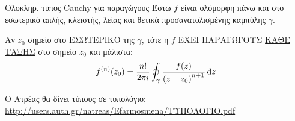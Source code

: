 \documentclass[12pt,a4paper,titlepage,fleqn]{article}
\begin{document}
    \begin{theorem*}{Ολοκληρ. τύπος Cauchy για παραγώγους}
    	\vspace{20pt}
    	Έστω \( f \) είναι ολόμορφη πάνω και στο εσωτερικό απλής, κλειστής, λείας
    	και θετικά προσανατολισμένης καμπύλης \( \gamma \).
    	
    	Αν \( z_0 \) σημείο στο ΕΣΩΤΕΡΙΚΟ της \( \gamma \), τότε η \( f \)
    	ΕΧΕΙ ΠΑΡΑΓΩΓΟΥΣ \underline{ΚΑΘΕ ΤΑΞΗΣ} στο σημείο \( z_0 \) και μάλιστα:
    	\[
    	f^{(n)}(z_0) = \frac{n!}{2\pi i}\oint_\gamma
    	\frac{f(z)}{\left(z-z_0\right)^{n+1}}\dif z
    	\]
    \end{theorem*}
    
    \begin{attnbox}{}
    	Ο Ατρέας θα δίνει τύπους σε τυπολόγιο:
    	\url{http://users.auth.gr/natreas/Efarmosmena/ΤΥΠΟΛΟΓΙΟ.pdf}
    \end{attnbox}
    
\end{document}
